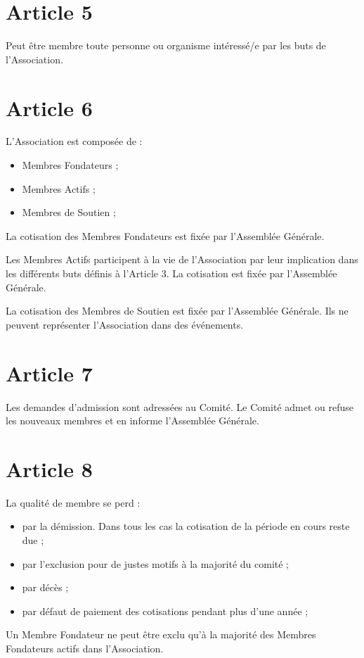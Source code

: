 \documentclass[12pt,twoside]{report}
\begin{document}
\section*{Article 5}
Peut être membre toute personne ou organisme intéressé/e par les buts de l’Association.

\section*{Article 6}
L’Association est composée de :
\begin{itemize}
\item Membres Fondateurs ;
\item Membres Actifs ;
\item Membres de Soutien ;
\end{itemize}

La cotisation des Membres Fondateurs est fixée par l’Assemblée Générale.

Les Membres Actifs participent à la vie de l’Association par leur implication dans les différents buts définis à l’Article 3. La cotisation est fixée par l’Assemblée Générale.

La cotisation des Membres de Soutien est fixée par l’Assemblée Générale. Ils ne peuvent représenter l’Association dans des événements.


\section*{Article 7}
Les demandes d’admission sont adressées au Comité. Le Comité admet ou refuse les nouveaux membres et en informe l’Assemblée Générale.

\section*{Article 8}
La qualité de membre se perd :
\begin{itemize}
\item par la démission. Dans tous les cas la cotisation de la période en cours reste due ;
\item par l’exclusion pour de justes motifs à la majorité du comité ;
\item par décès ;
\item par défaut de paiement des cotisations pendant plus d'une année ;
\end{itemize}

Un Membre Fondateur ne peut être exclu qu’à la majorité des Membres Fondateurs actifs dans l’Association.
\end{document}
